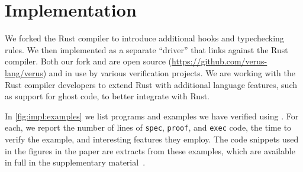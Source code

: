 
\section{Implementation} \label{sec:implementation}

We forked the Rust compiler to introduce additional hooks and typechecking rules.
We then implemented \verus as a separate ``driver'' that links against the Rust compiler.
Both our fork and \verus are open source (\url{https://github.com/verus-lang/verus}) and in use by various verification projects.
We are working with the Rust compiler developers to 
extend Rust with additional language features, such as support
for ghost code, to better integrate \verus with Rust. %

In \autoref{fig:impl:examples} we list programs and examples we have verified using \verus.
For each, we report the number of lines of \verb`spec`, \verb`proof`,
and \verb`exec` code, the time to verify the example, and interesting \verus features they employ. 
The code snippets used in the figures in the paper are extracts from these examples,
which are available in full in the supplementary material~\cite{verussupplementary}.

